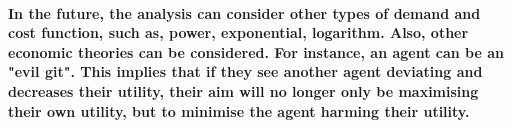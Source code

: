 \documentclass[11pt]{report}
\begin{document}
\paragraph{In the future, the analysis can consider other types of demand and cost function, such as, power, exponential, logarithm. Also, other economic theories can be considered. For instance, an agent can be an "evil git". This implies that if they see another agent deviating and decreases their utility, their aim will no longer only be maximising their own utility, but to minimise the agent harming their utility.}


 
\end{document}
